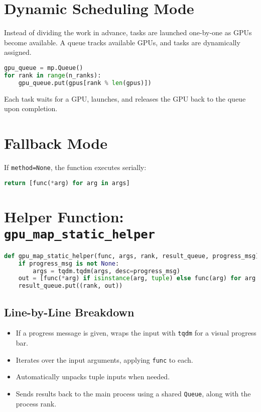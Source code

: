 \documentclass{article}
\begin{document}
\section*{Dynamic Scheduling Mode}

Instead of dividing the work in advance, tasks are launched one-by-one as GPUs become available. A queue tracks available GPUs, and tasks are dynamically assigned.

\begin{lstlisting}[language=Python]
gpu_queue = mp.Queue()
for rank in range(n_ranks):
    gpu_queue.put(gpus[rank % len(gpus)])
\end{lstlisting}

Each task waits for a GPU, launches, and releases the GPU back to the queue upon completion.

\section*{Fallback Mode}

If \texttt{method=None}, the function executes serially:

\begin{lstlisting}[language=Python]
return [func(*arg) for arg in args]
\end{lstlisting}

\section*{Helper Function: \texttt{gpu\_map\_static\_helper}}

\begin{lstlisting}[language=Python]
def gpu_map_static_helper(func, args, rank, result_queue, progress_msg):
    if progress_msg is not None:
        args = tqdm.tqdm(args, desc=progress_msg)
    out = [func(*arg) if isinstance(arg, tuple) else func(arg) for arg in args]
    result_queue.put((rank, out))
\end{lstlisting}

\subsection*{Line-by-Line Breakdown}
\begin{itemize}
  \item If a progress message is given, wraps the input with \texttt{tqdm} for a visual progress bar.
  \item Iterates over the input arguments, applying \texttt{func} to each.
  \item Automatically unpacks tuple inputs when needed.
  \item Sends results back to the main process using a shared \texttt{Queue}, along with the process rank.
\end{itemize}
\end{document}
